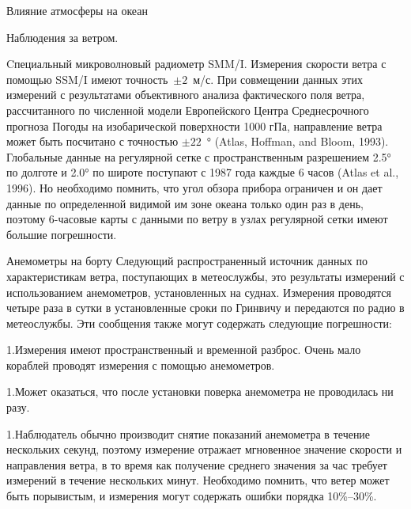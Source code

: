 \begin{chapter}{Влияние атмосферы на океан}
\begin{section}{Наблюдения за ветром.}
\begin{paragraph}{Cпециальный микроволновый радиометр SMM/I.}
Измерения скорости ветра с помощью SSM/I имеют точность~$\pm 2$~м/с. При
совмещении данных этих измерений с результатами объективного анализа
фактического поля ветра, рассчитанного по численной модели
Европейского Центра Среднесрочного прогноза Погоды на изобарической
поверхности 1000 гПа, направление ветра может быть посчитано с
точностью $\pm 22$~° (Atlas, Hoffman, and Bloom, 1993). Глобальные данные
на регулярной сетке с пространственным разрешением 2.5° по долготе и
2.0° по широте поступают с 1987 года каждые 6 часов (Atlas et al.,
1996). Но необходимо помнить, что угол обзора прибора ограничен и он
дает данные по определенной видимой им зоне океана только один раз в
день, поэтому 6-часовые карты с данными по ветру в узлах регулярной
сетки имеют большие погрешности.
%
\end{paragraph}

\begin{paragraph}{Анемометры на борту}
Следующий распространенный источник данных по характеристикам ветра,
поступающих в метеослужбы, это результаты измерений с использованием
анемометров, установленных на суднах. Измерения проводятся четыре раза
в сутки в установленные сроки по Гринвичу и передаются по радио в
метеослужбы.
%
%
Эти сообщения также могут содержать следующие погрешности:

1.Измерения имеют пространственный и временной разброс. Очень мало
  кораблей проводят измерения с помощью анемометров.

1.Может оказаться, что после установки поверка анемометра не
  проводилась ни разу.

1.Наблюдатель обычно производит снятие показаний анемометра в течение
  нескольких секунд, поэтому измерение отражает мгновенное значение
  скорости и направления ветра, в то время как получение среднего
  значения за час требует измерений в течение нескольких
  минут. Необходимо помнить, что ветер может быть порывистым, и
  измерения могут содержать ошибки порядка 10\%--30\%.


\end{paragraph}
\end{section}
\end{chapter}
